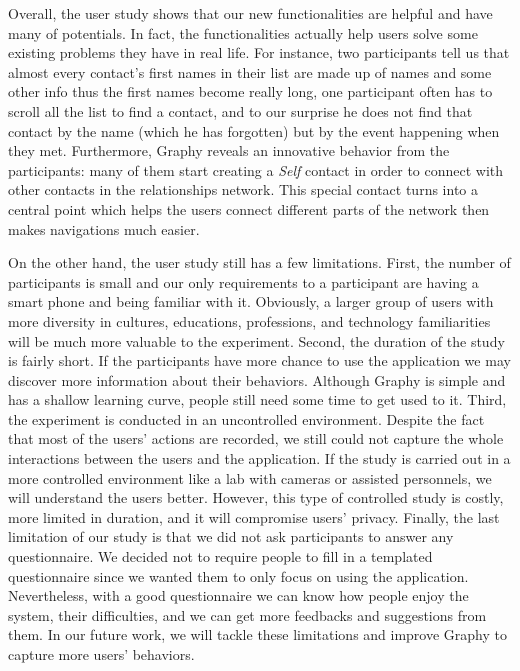 Overall, the user study shows that our new functionalities are helpful and have many of potentials. In fact, the functionalities actually help users solve some existing problems they have in real life. For instance, two participants tell us that almost every contact's first names in their list are made up of names and some other info thus the first names become really long, one participant often has to scroll all the list to find a contact, and to our surprise he does not find that contact by the name (which he has forgotten) but by the event happening when they met. Furthermore, Graphy reveals an innovative behavior from the participants: many of them start creating a \textit{Self} contact in order to connect with other contacts in the relationships network. This special contact turns into a central point which helps the users connect different parts of the network then makes navigations much easier.

On the other hand, the user study still has a few limitations. First, the number of participants is small and our only requirements to a participant are having a smart phone and being familiar with it. Obviously, a larger group of users with more diversity in cultures, educations, professions, and technology familiarities will be much more valuable to the experiment. Second, the duration of the study is fairly short. If the participants have more chance to use the application we may discover more information about their behaviors. Although Graphy is simple and has a shallow learning curve, people still need some time to get used to it. Third, the experiment is conducted in an uncontrolled environment. Despite the fact that most of the users' actions are recorded, we still could not capture the whole interactions between the users and the application. If the study is carried out in a more controlled environment like a lab with cameras or assisted personnels, we will understand the users better. However, this type of controlled study is costly, more limited in duration, and it will compromise users' privacy. Finally, the last limitation of our study is that we did not ask participants to answer any questionnaire. We decided not to require people to fill in a templated questionnaire since we wanted them to only focus on using the application. Nevertheless, with a good questionnaire we can know how people enjoy the system, their difficulties, and we can get more feedbacks and suggestions from them. In our future work, we will tackle these limitations and improve Graphy to capture more users' behaviors.


